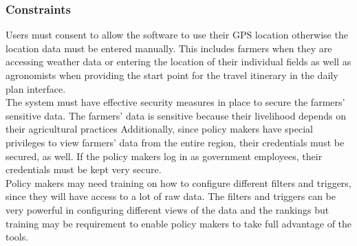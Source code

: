 \subsubsection{Constraints}
\begin{flushleft}
Users must consent to allow the software to use their GPS location otherwise the location data must be entered manually. This includes farmers when they are accessing weather data or entering the location of their individual fields as well as agronomists when providing the start point for the travel itinerary in the daily plan interface. \\
\smallskip
The system must have effective security measures in place to secure the farmers' sensitive data. The farmers' data is sensitive because their livelihood depends on their agricultural practices Additionally, since policy makers have special privileges to view farmers' data from the entire region, their credentials must be secured, as well. If the policy makers log in as government employees, their credentials must be kept very secure.\\
\smallskip
Policy makers may need training on how to configure different filters and triggers, since they will have access to a lot of raw data. The filters and triggers can be very powerful in configuring different views of the data and the rankings but training may be requirement to enable policy makers to take full advantage of the tools. 
\end{flushleft}

